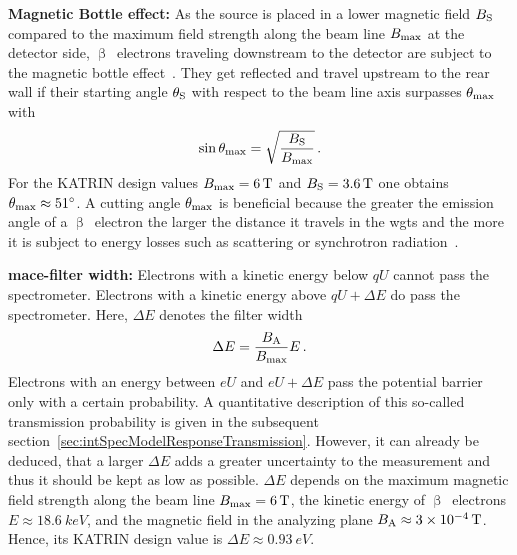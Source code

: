 {{\par \textbf{Magnetic Bottle effect:}
As the source is placed in a lower magnetic field $B_\mathrm{S}$ compared to the maximum field strength along the beam line $B_\mathrm{max}$ at the detector side, $\upbeta$~electrons traveling downstream to the detector are subject to the magnetic bottle effect~\cite{Angrik:2005ep}. They get reflected and travel upstream to the rear wall if their starting angle $\theta_\mathrm{S}$ with respect to the beam line axis surpasses $\theta_\mathrm{max}$ with
\begin{equation}
\label{eq:thetaMax}
\sin\theta_\mathrm{max} = \sqrt{\frac{B_\mathrm{S}}{B_\mathrm{max}}} 
\text{\,.}
\end{equation}
For the KATRIN design values $B_\mathrm{max}=\SI{6}{T}$ and $B_\mathrm{S}=\SI{3.6}{T}$ one obtains $\theta_\mathrm{max}\approx\SI{51}{\degree}$.
A cutting angle $\theta_\mathrm{max}$ is beneficial because the greater the emission angle of a $\upbeta$~electron the larger the distance it travels in the \gls{wgts} and the more it is subject to energy losses such as scattering or synchrotron radiation~\cite{Angrik:2005ep}.}

{\par \textbf{\gls{mace}-filter width:} 
Electrons with a kinetic energy below $qU$ cannot pass the spectrometer. Electrons with a kinetic energy above $qU+\Delta E$ do pass the spectrometer. Here, $\Delta E$ denotes the filter width \cite{Angrik:2005ep}
\begin{equation}
\label{eq:katrinExpSetupFilterWidth}
\Delta E = \frac{B_\mathrm{A}}{B_\mathrm{max}} E
\text{\,.}
\end{equation}
Electrons with an energy between $eU$ and $eU+\Delta E$ pass the potential barrier only with a certain probability. A quantitative description of this so-called transmission probability is given in the subsequent section~\ref{sec:intSpecModelResponseTransmission}. However, it can already be deduced, that a larger $\Delta E$ adds a greater uncertainty to the measurement and thus it should be kept as low as possible. $\Delta E$ depends on the maximum magnetic field strength along the beam line $B_\mathrm{max}=\SI{6}{T}$, the kinetic energy of $\upbeta$~electrons $E\approx\SI{18.6}{keV}$, and the magnetic field in the analyzing plane $B_\mathrm{A}\approx\SI{3e-4}{T}$. Hence, its KATRIN design value is $\Delta E\approx\SI{0.93}{eV}$. }

}

